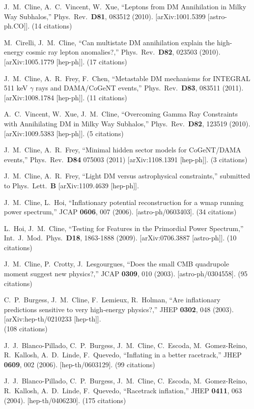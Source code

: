 \documentclass[12pt]{article}
\begin{document}
\begin{thebibliography}{99}
  J.~M.~Cline, A.~C.~Vincent, W.~Xue,
  ``Leptons from DM Annihilation in Milky Way Subhalos,''
  Phys.\ Rev.\  {\bf D81}, 083512 (2010).
  [arXiv:1001.5399 [astro-ph.CO]]. (14 citations)

  M.~Cirelli, J.~M.~Cline,
  ``Can multistate DM annihilation explain the high-energy cosmic ray lepton anomalies?,''
  Phys.\ Rev.\  {\bf D82}, 023503 (2010).
  [arXiv:1005.1779 [hep-ph]]. (17 citations)

  J.~M.~Cline, A.~R.~Frey, F.~Chen,
  ``Metastable DM mechanisms for INTEGRAL 511 keV $\gamma$ rays and DAMA/CoGeNT events,''
  Phys.\ Rev.\  {\bf D83}, 083511 (2011).
  [arXiv:1008.1784 [hep-ph]]. (11 citations)

  A.~C.~Vincent, W.~Xue, J.~M.~Cline,
  ``Overcoming Gamma Ray Constraints with Annihilating DM in Milky Way Subhalos,''
  Phys.\ Rev.\  {\bf D82}, 123519 (2010).
  [arXiv:1009.5383 [hep-ph]]. (5 citations)

  J.~M.~Cline, A.~R.~Frey,
  ``Minimal hidden sector models for CoGeNT/DAMA events,''
  Phys.\ Rev.\  {\bf D84} 075003 (2011) 
  [arXiv:1108.1391 [hep-ph]]. (3 citations)

  J.~M.~Cline, A.~R.~Frey,
  ``Light DM versus astrophysical constraints,''
  submitted to Phys.\ Lett.\ {\bf B}
  [arXiv:1109.4639 [hep-ph]].

  J.~M.~Cline, L.~Hoi,
  ``Inflationary potential reconstruction for a wmap running power spectrum,''
  JCAP {\bf 0606}, 007 (2006).
  [astro-ph/0603403]. (34 citations)

  L.~Hoi, J.~M.~Cline,
  ``Testing for Features in the Primordial Power Spectrum,''
  Int.\ J.\ Mod.\ Phys.\  {\bf D18}, 1863-1888 (2009).
  [arXiv:0706.3887 [astro-ph]]. (10 citations)

  J.~M.~Cline, P.~Crotty, J.~Lesgourgues,
  ``Does the small CMB quadrupole moment suggest new physics?,''
  JCAP {\bf 0309}, 010 (2003).
  [astro-ph/0304558]. (95 citations)

  C.~P.~Burgess, J.~M.~Cline, F.~Lemieux, R.~Holman,
  ``Are inflationary predictions sensitive to very high-energy physics?,''
  JHEP {\bf 0302}, 048 (2003). 
  [arXiv:hep-th/0210233 [hep-th]].\\ (108 citations)

  J.~J.~Blanco-Pillado, C.~P.~Burgess, J.~M.~Cline, C.~Escoda, M.~Gomez-Reino, R.~Kallosh, A.~D.~Linde, F.~Quevedo,
  ``Inflating in a better racetrack,''
  JHEP {\bf 0609}, 002 (2006).
  [hep-th/0603129]. (99 citations)

  J.~J.~Blanco-Pillado, C.~P.~Burgess, J.~M.~Cline, C.~Escoda, M.~Gomez-Reino, R.~Kallosh, A.~D.~Linde, F.~Quevedo,
  ``Racetrack inflation,''
  JHEP {\bf 0411}, 063 (2004).
  [hep-th/0406230]. (175 citations)

\end{thebibliography}
\end{document}
